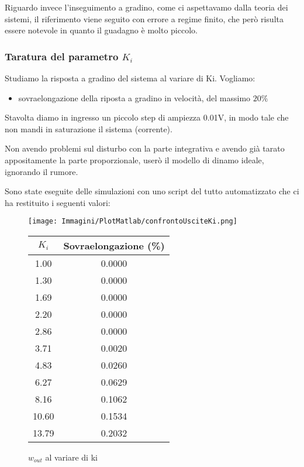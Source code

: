 \documentclass[a4paper,12pt]{article}
\begin{document}
Riguardo invece l'inseguimento a gradino, come ci aspettavamo dalla teoria dei sistemi, il riferimento viene seguito con errore a regime finito, che però risulta essere notevole in quanto il guadagno è molto piccolo.


\subsubsection{Taratura del parametro $K_i$}

Studiamo la risposta a gradino del sistema al variare di Ki.  Vogliamo:

\begin{itemize}
    \item sovraelongazione della riposta a gradino in velocità, del massimo $20\%$
\end{itemize}

Stavolta diamo in ingresso un piccolo step di ampiezza 0.01V, in modo tale che non mandi in saturazione il sistema (corrente).

Non avendo problemi sul disturbo con la parte integrativa e avendo già tarato appositamente la parte proporzionale, userò il modello di dinamo ideale, ignorando il rumore.

\vspace{0.5cm}

Sono state eseguite delle simulazioni con uno script del tutto automatizzato che ci ha restituito i seguenti valori:

\begin{figure}[h!]
\centering
\begin{minipage}{0.6\textwidth}
    \centering
    \texttt{[image: Immagini/PlotMatlab/confrontoUsciteKi.png]} 
    \caption{$w_{out}$ al variare di ki}
    \label{fig:sovraelongazione_ki}
\end{minipage}
\hfill
\begin{minipage}{0.38\textwidth}
    \centering
    \small
    \begin{tabular}{|c|c|}
        \hline
        \textbf{$K_i$} & \textbf{Sovraelongazione (\%)} \\
        \hline
        1.00  & 0.0000 \\
        1.30  & 0.0000 \\
        1.69  & 0.0000 \\
        2.20  & 0.0000 \\
        2.86  & 0.0000 \\
        3.71  & 0.0020 \\
        4.83  & 0.0260 \\
        6.27  & 0.0629 \\
        8.16  & 0.1062 \\
        10.60 & 0.1534 \\
        13.79 & 0.2032 \\
        \hline
    \end{tabular}
    \label{tab:sovraelongazione_ki}
\end{minipage}
\end{figure}
\end{document}
